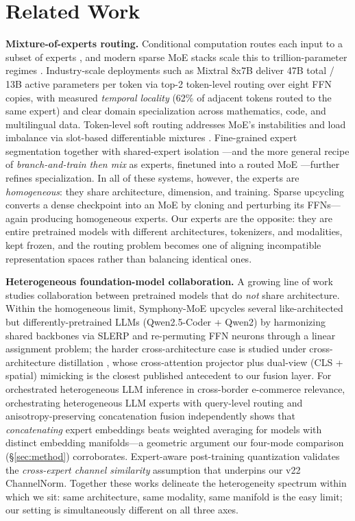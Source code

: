 \documentclass[10pt,twoside]{article}
\theoremstyle{definition}
\begin{document}
\section{Related Work}
\label{sec:related}

\textbf{Mixture-of-experts routing.} Conditional computation routes each input to a subset of experts \citep{jacobs1991,shazeerOutrageouslyLargeNeural2017}, and modern sparse MoE stacks scale this to trillion-parameter regimes \citep{fedus2022,zoph2022}. Industry-scale deployments such as Mixtral 8x7B \citep{jiang2024mixtral} deliver 47B total / 13B active parameters per token via top-2 token-level routing over eight FFN copies, with measured \emph{temporal locality} (62\% of adjacent tokens routed to the same expert) and clear domain specialization across mathematics, code, and multilingual data. Token-level soft routing addresses MoE's instabilities and load imbalance via slot-based differentiable mixtures \citep{puigcerver2024softmoe}. Fine-grained expert segmentation together with shared-expert isolation \citep{dai2024}---and the more general recipe of \emph{branch-and-train then mix} as experts, finetuned into a routed MoE \citep{sukhbaatar2024btx}---further refines specialization. In all of these systems, however, the experts are \emph{homogeneous}: they share architecture, dimension, and training. Sparse upcycling \citep{komatsuzaki2023} converts a dense checkpoint into an MoE by cloning and perturbing its FFNs---again producing homogeneous experts. Our experts are the opposite: they are entire pretrained models with different architectures, tokenizers, and modalities, kept frozen, and the routing problem becomes one of aligning incompatible representation spaces rather than balancing identical ones.

\textbf{Heterogeneous foundation-model collaboration.} A growing line of work studies collaboration between pretrained models that do \emph{not} share architecture. Within the homogeneous limit, Symphony-MoE \citep{wang2025symphony} upcycles several like-architected but differently-pretrained LLMs (Qwen2.5-Coder + Qwen2) by harmonizing shared backbones via SLERP and re-permuting FFN neurons through a linear assignment problem; the harder cross-architecture case is studied under cross-architecture distillation \citep{wang2024scalekd}, whose cross-attention projector plus dual-view (CLS + spatial) mimicking is the closest published antecedent to our fusion layer. For orchestrated heterogeneous LLM inference in cross-border e-commerce relevance, orchestrating heterogeneous LLM experts with query-level routing and anisotropy-preserving concatenation fusion \citep{liu2026orchestrating} independently shows that \emph{concatenating} expert embeddings beats weighted averaging for models with distinct embedding manifolds---a geometric argument our four-mode comparison (\S\ref{sec:method}) corroborates. Expert-aware post-training quantization \citep{du2026eaquant} validates the \emph{cross-expert channel similarity} assumption that underpins our v22 ChannelNorm. Together these works delineate the heterogeneity spectrum within which we sit: same architecture, same modality, same manifold is the easy limit; our setting is simultaneously different on all three axes.
\end{document}
